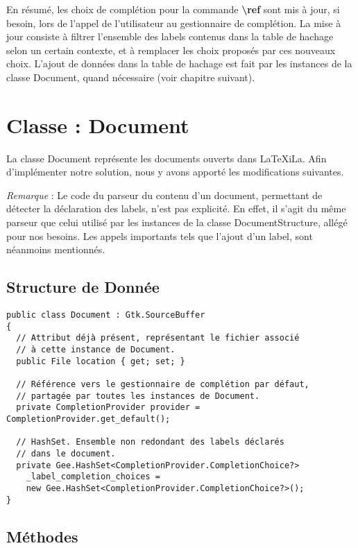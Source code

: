 \documentclass[a4paper,11pt]{report}
\begin{document}
En résumé, les choix de complétion pour la commande \textbf{\textbackslash{}ref} sont mis à jour, si besoin, lors de l'appel de l'utilisateur au gestionnaire de complétion.
La mise à jour consiste à filtrer l'ensemble des labels contenus dans la table de hachage selon un certain contexte, et à remplacer les choix proposés par ces nouveaux choix.
L'ajout de données dans la table de hachage est fait par les instances de la classe Document, quand nécessaire (voir chapitre suivant).

\chapter{Classe : Document}
\label{cha:classe_document}

La classe Document représente les documents ouverts dans LaTeXiLa.
Afin d'implémenter notre solution, nous y avons apporté les modifications suivantes.

\textit{Remarque} : Le code du parseur du contenu d'un document, permettant de détecter la déclaration des labels, n'est pas explicité. En effet, il s'agit du même parseur que celui utilisé par les instances de la classe DocumentStructure, allégé pour nos besoins. Les appels importants tels que l'ajout d'un label, sont néanmoins mentionnés.

\section{Structure de Donnée}
\label{sec:D_structure_de_données}

\begin{lstlisting}[frame=single]
public class Document : Gtk.SourceBuffer
{
  // Attribut déjà présent, représentant le fichier associé
  // à cette instance de Document.
  public File location { get; set; }

  // Référence vers le gestionnaire de complétion par défaut,
  // partagée par toutes les instances de Document.
  private CompletionProvider provider = CompletionProvider.get_default();
  
  // HashSet. Ensemble non redondant des labels déclarés
  // dans le document.
  private Gee.HashSet<CompletionProvider.CompletionChoice?> 
    _label_completion_choices =
    new Gee.HashSet<CompletionProvider.CompletionChoice?>();
}
\end{lstlisting}

\section{Méthodes}
\label{sec:D_méthodes}
\end{document}
